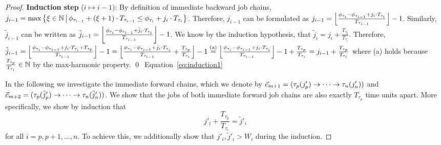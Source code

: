 \documentclass[10pt,conference]{resources/IEEEtran}
\theoremstyle{definition}
\newcommand{\fc}{\fw{c}}
\begin{document}
\begin{proof}
	\textbf{Induction step} ($i \mapsto i-1$):
	By definition of immediate backward job chains, 
	$j_{i-1} = \max \left\{\xi \in \mathbb{N} \,\middle|\,  \phi_{\tau_{i-1}} + (\xi+1) \cdot T_{\tau_{i-1}} \leq \phi_{\tau_i} + j_i \cdot T_{\tau_{i}}\right\}$.
	Therefore, $j_{i-1}$ can be formulated as 
	$j_{i-1} = \left\lfloor{\frac{\phi_{\tau_i} - \phi_{\tau_{i-1}} + j_i \cdot T_{\tau_i}}{T_{\tau_{i-1}}}}\right\rfloor -1$.
	Similarly, $\tilde{j}_{i-1}$ can be written as 
	$\tilde{j}_{i-1} = \left\lfloor{\frac{\phi_{\tau_i} - \phi_{\tau_{i-1}} + \tilde{j}_i \cdot T_{\tau_i}}{T_{\tau_{i-1}}}}\right\rfloor -1$.
	We know by the induction hypothesis, that $\tilde{j}_i = j_i + \frac{T_{\tau_p}}{T_{\tau_i}}$.
	Therefore, 
	\begin{math}
		\tilde{j}_{i-1} 
		= \left\lfloor{\frac{\phi_{\tau_i} - \phi_{\tau_{i-1}} + j_i \cdot T_{\tau_i} + T_{\tau_p}}{T_{\tau_{i-1}}}}\right\rfloor -1
		= \left\lfloor{\frac{\phi_{\tau_i} - \phi_{\tau_{i-1}} + j_i \cdot T_{\tau_i}}{T_{\tau_{i-1}}} + \frac{T_{\tau_p}}{T_{\tau_i}}}\right\rfloor -1
		\overset{\text{(a)}}{=} \left\lfloor{\frac{\phi_{\tau_i} - \phi_{\tau_{i-1}} + j_i \cdot T_{\tau_i}}{T_{\tau_{i-1}}}}\right\rfloor -1 + \frac{T_{\tau_p}}{T_{\tau_i}}
		= j_{i-1} + \frac{T_{\tau_p}}{T_{\tau_i}}
	\end{math}
	where (a) holds because $\frac{T_{\tau_p}}{T_{\tau_i}} \in \mathbb{N}$ by the max-harmonic property. \qed~Equation~\eqref{eq:induction1}

	In the following we investigate the immediate forward chains, which we denote by
	$\fc_{m+1} = (\tau_p(j'_p) \to\dots\to \tau_n(j'_n))$ and $\fc_{m+2} = (\tau_p(\tilde{j}'_p) \to\dots\to \tau_n({\tilde{j}'}_n))$.
	We show that the jobs of both immediate forward job chains are also exactly $T_{\tau_p}$ time units apart.
	More specifically, we show by induction that 
	\begin{equation}\label{eq:induction2}
		j'_i + \frac{T_{\tau_p}}{T_{\tau_i}} = \tilde{j}'_i
	\end{equation}
	for all $i=p, p{+}1, \dots, n$.
	To achieve this, we additionally show that $j'_i, \tilde{j}'_i > W_i$ during the induction.


\end{proof}
\end{document}
